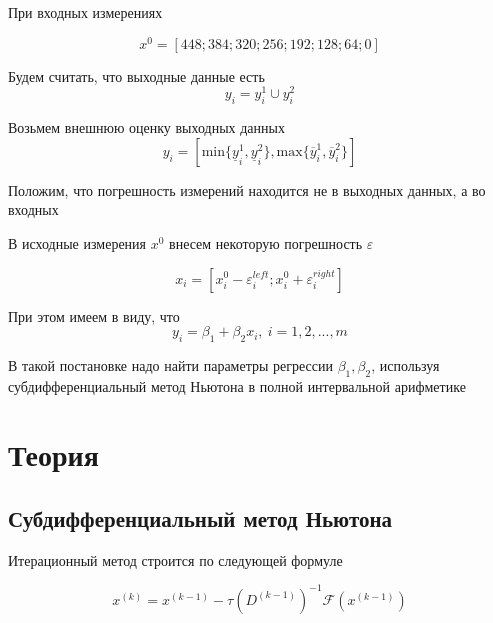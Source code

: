 \documentclass[12pt,a4paper]{article}
\begin{document}
        При входных измерениях
        
        \begin{equation}
            x^{0} = [448; 384; 320; 256; 192; 128; 64; 0]
        \end{equation}
        
        Будем считать, что выходные данные есть
        \begin{equation}
            y_{i} = y_{i}^{1} \cup y_{i}^{2}
        \end{equation}
        
        Возьмем внешнюю оценку выходных данных 
        \begin{equation}\label{eq:y_interval}
            y_i = [\text{min}\{\underline{y}_{i}^{1}, \underline{y}_{i}^{2}\}, \text{max}\{\overline{y}_{i}^{1}, \overline{y}_{i}^{2}\}]
        \end{equation}
        
        Положим, что погрешность измерений находится не в выходных данных, а во входных
        
        В исходные измерения $x^{0}$ внесем некоторую погрешность $\varepsilon$
        
        \begin{equation}\label{eq:x_interval}
            x_i = [x_{i}^{0} - \varepsilon_{i}^{left}; x_{i}^{0} + \varepsilon_{i}^{right}]
        \end{equation}
        
        При этом имеем в виду, что 
        \begin{equation}
            y_{i} = \beta_{1} + \beta_{2}x_{i}, \: i=1, 2, ... , m
        \end{equation}
    
        В такой постановке надо найти параметры регрессии $\beta_{1}, \beta_{2}$, используя субдифференциальный метод Ньютона в полной интервальной арифметике
    
    
    \section{Теория}
        \subsection{Субдифференциальный метод Ньютона}
            Итерационный метод строится по следующей формуле
            
            \begin{equation}
                x^{(k)} = x^{(k-1)} - \tau (D^{(k-1)})^{-1}\mathcal{F}(x^{(k-1)})
            \end{equation}
            
\end{document}
